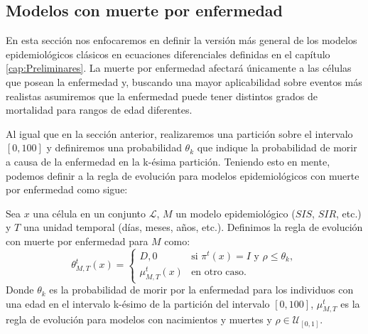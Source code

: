 \subsection{Modelos con muerte por enfermedad}\label{sub:MuertePorEnfermedad}
En esta sección nos enfocaremos en definir la versión más general de los modelos epidemiológicos clásicos en ecuaciones diferenciales definidas en el capítulo \ref{cap:Preliminares}. La muerte por enfermedad afectará únicamente a las células que posean la enfermedad y, buscando una mayor aplicabilidad sobre eventos más realistas asumiremos que la enfermedad puede tener distintos grados de mortalidad para rangos de edad diferentes. 

Al igual que en la sección anterior, realizaremos una partición sobre el intervalo $[0,100]$ y definiremos una probabilidad $\theta_k$ que indique la probabilidad de morir a causa de la enfermedad en la k-ésima partición. Teniendo esto en mente, podemos definir a la regla de evolución para modelos epidemiológicos con muerte por enfermedad como sigue:

\begin{definition}\label{def:reglaMuertePorEnfermedad}
Sea $x$ una célula en un conjunto $\mathcal{L}$, $M$ un modelo epidemiológico ($SIS$, $SIR$, etc.) y $T$ una unidad temporal (días, meses, años, etc.). Definimos la regla de evolución con muerte por enfermedad para $M$ como:
\begin{equation}
    \theta_{M,T}^t(x)=\left\{\begin{array}{ll}
        D,0 & \text{si }\pi^t(x)=I\text{ y }\rho\leq\theta_k, \\
        \mu_{M,T}^t(x) & \text{en otro caso.}
    \end{array}\right.
\end{equation}
Donde $\theta_k$ es la probabilidad de morir por la enfermedad para los individuos con una edad en el intervalo k-ésimo de la partición del intervalo $[0,100]$, $\mu_{M,T}^t$ es la regla de evolución para modelos con nacimientos y muertes y $\rho\in\mathcal{U}_{[0,1]}$.
\end{definition}

